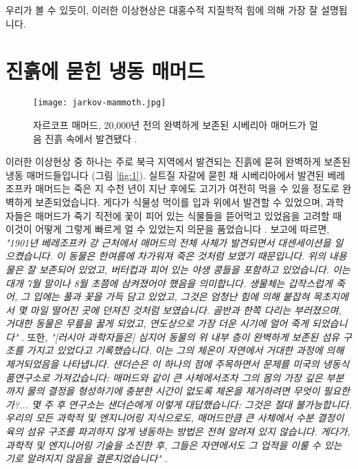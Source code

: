 \documentclass[10pt,twocolumn,letterpaper]{article}
\begin{document}
우리가 볼 수 있듯이, 이러한 이상현상은 대홍수적 지질학적 힘에 의해 가장 잘 설명됩니다.

\section{진흙에 묻힌 냉동 매머드}

\begin{figure}[t]
\begin{center}
   \texttt{[image: jarkov-mammoth.jpg]}
\end{center}
   \caption{자르코프 매머드, 20,000년 전의 완벽하게 보존된 시베리아 매머드가 얼음 진흙 속에서 발견됐다 \cite{51}.}
\label{fig:1}
\label{fig:onecol}
\end{figure}

이러한 이상현상 중 하나는 주로 북극 지역에서 발견되는 진흙에 묻혀 완벽하게 보존된 냉동 매머드들입니다 (그림 \ref{fig:1}). 실트질 자갈에 묻힌 채 시베리아에서 발견된 베레조프카 매머드는 죽은 지 수천 년이 지난 후에도 고기가 여전히 먹을 수 있을 정도로 완벽하게 보존되었습니다. 게다가 식물성 먹이를 입과 위에서 발견할 수 있었으며, 과학자들은 매머드가 죽기 직전에 꽃이 피어 있는 식물들을 뜯어먹고 있었음을 고려할 때 이것이 어떻게 그렇게 빠르게 얼 수 있었는지 의문을 품었습니다 \cite{17}. 보고에 따르면, \textit{"1901년 베레조프카 강 근처에서 매머드의 전체 사체가 발견되면서 대센세이션을 일으켰습니다. 이 동물은 한여름에 차가워져 죽은 것처럼 보였기 때문입니다. 위의 내용물은 잘 보존되어 있었고, 버터컵과 피어 있는 야생 콩들을 포함하고 있었습니다. 이는 대개 7월 말이나 8월 초쯤에 삼켜졌어야 했음을 의미합니다. 생물체는 갑작스럽게 죽어, 그 입에는 풀과 꽃을 가득 담고 있었고, 그것은 엄청난 힘에 의해 붙잡혀 목초지에서 몇 마일 떨어진 곳에 던져진 것처럼 보였습니다. 골반과 한쪽 다리는 부러졌으며, 거대한 동물은 무릎을 꿇게 되었고, 연도상으로 가장 더운 시기에 얼어 죽게 되었습니다"} \cite{18}. 또한, \textit{"[러시아 과학자들은] 심지어 동물의 위 내부 층이 완벽하게 보존된 섬유 구조를 가지고 있었다고 기록했습니다. 이는 그의 체온이 자연에서 거대한 과정에 의해 제거되었음을 나타냅니다. 샌더슨은 이 하나의 점에 주목하면서 문제를 미국의 냉동식품연구소로 가져갔습니다: 매머드와 같이 큰 사체에서조차 그의 몸의 가장 깊은 부분까지 물의 결정을 형성하기에 충분한 시간이 없도록 체온을 제거하려면 무엇이 필요한가?... 몇 주 후 연구소는 샌더슨에게 이렇게 대답했습니다: 그것은 절대 불가능합니다. 우리의 모든 과학적 및 엔지니어링 지식으로도, 매머드만큼 큰 사체에서 수분 결정이 육의 섬유 구조를 파괴하지 않게 냉동하는 방법은 전혀 알려져 있지 않습니다. 게다가, 과학적 및 엔지니어링 기술을 소진한 후, 그들은 자연에서도 그 업적을 이룰 수 있는 기로 알려지지 않음을 결론지었습니다"} \cite{19}.
\end{document}
